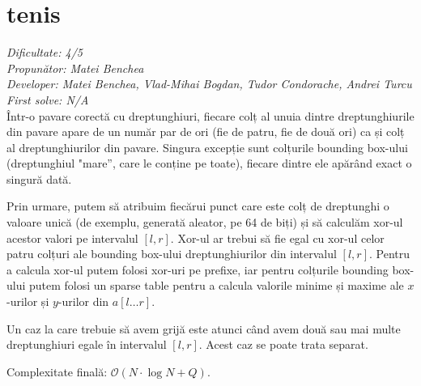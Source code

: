 \section{tenis}
\textit{Dificultate: 4/5} \\
\textit{Propunător: Matei Benchea} \\
\textit{Developer: Matei Benchea, Vlad-Mihai Bogdan, Tudor Condorache, Andrei Turcu} \\
\textit{First solve: N/A}  \\

Într-o pavare corectă cu dreptunghiuri, fiecare colț al unuia dintre dreptunghiurile din pavare apare de un număr par de ori (fie de patru, fie de două ori) ca și colț al dreptunghiurilor din pavare. Singura excepție sunt colțurile bounding box-ului (dreptunghiul "mare”, care le conține pe toate), fiecare dintre ele apărând exact o singură dată.

Prin urmare, putem să atribuim fiecărui punct care este colț de dreptunghi o valoare unică (de exemplu, generată aleator, pe 64 de biți) și să calculăm xor-ul acestor valori pe intervalul $[l, r]$. Xor-ul ar trebui să fie egal cu xor-ul celor patru colțuri ale bounding box-ului dreptunghiurilor din intervalul $[l, r]$. Pentru a calcula xor-ul putem folosi xor-uri pe prefixe, iar pentru colțurile bounding box-ului putem folosi un sparse table pentru a calcula valorile minime și maxime ale $x$-urilor și $y$-urilor din $a[l \dots r]$.

Un caz la care trebuie să avem grijă este atunci când avem două sau mai multe dreptunghiuri egale în intervalul $[l, r]$. Acest caz se poate trata separat.

\medskip

Complexitate finală: $\mathcal{O}(N \cdot \log N + Q)$.
